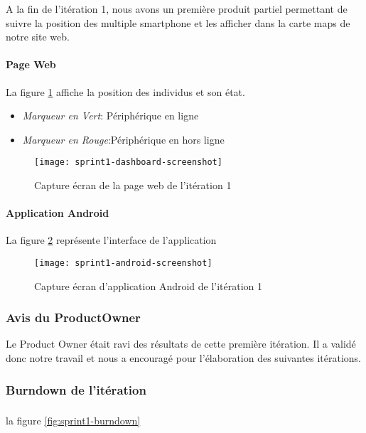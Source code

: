 A la fin de l'itération 1, nous avons un première produit partiel permettant de
suivre la position des multiple smartphone et les afficher dans la carte
maps de notre site web.

\paragraph{Page Web }

La figure \ref{fig:sprint1-dashboard-screenshot} affiche la position des individus et son état.
\begin{itemize}
 \item \textit{Marqueur en Vert}: Périphérique en ligne
 \item \textit{Marqueur en Rouge}:Périphérique en hors ligne
\end{itemize}

\begin{figure}[htbp]
  \centering
  \texttt{[image: sprint1-dashboard-screenshot]}
  \caption{Capture écran de la page web de l'itération 1}
  \label{fig:sprint1-dashboard-screenshot}
\end{figure}

\paragraph{Application Android}

La figure \ref{fig:sprint1-android-screenshot} représente l'interface de l'application
\begin{figure}[htbp]
  \centering
  \texttt{[image: sprint1-android-screenshot]}
  \caption{Capture écran d'application Android de l'itération 1}
  \label{fig:sprint1-android-screenshot}
\end{figure}

\subsubsection{Avis du ProductOwner}

Le Product Owner était ravi des résultats de cette première itération. Il a validé donc notre
travail et nous a encouragé pour l'élaboration des suivantes itérations.

\subsubsection{Burndown de l'itération}
\subsubsection*{}
la figure \ref{fig:sprint1-burndown}


